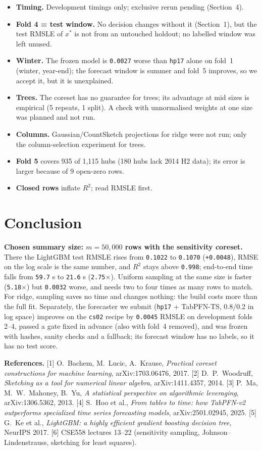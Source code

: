 \documentclass[10pt,a4paper,twocolumn]{article}
\newcommand{\n}[1]{\texttt{#1}}
\newcommand{\code}[1]{\texttt{#1}}
\begin{document}
\begin{itemize}
\item \textbf{Timing.} Development timings only; exclusive rerun pending (Section~4).
\item \textbf{Fold 4 = test window.} No decision changes without it (Section~1), but the test RMSLE of $x^\ast$ is not from an
  untouched holdout; no labelled window was left unused.
\item \textbf{Winter.} The frozen model is \n{0.0027} worse than \code{hp17} alone on fold~1 (winter, year-end); the forecast
  window is summer and fold~5 improves, so we accept it, but it is unexplained.
\item \textbf{Trees.} The coreset has no guarantee for trees; its advantage at mid sizes is empirical (5 repeats, 1 split). A
  check with unnormalised weights at one size was planned and not run.
\item \textbf{Columns.} Gaussian/CountSketch projections for ridge were not run; only the column-selection experiment for trees.
\item \textbf{Fold 5} covers 935 of 1{,}115 hubs (180 hubs lack 2014 H2 data); its error is larger because of 9 open-zero rows.
\item \textbf{Closed rows} inflate $R^2$; read RMSLE first.
\end{itemize}

\section{Conclusion}

\textbf{Chosen summary size: $m=50{,}000$ rows with the sensitivity coreset.} There the LightGBM test RMSLE rises from
\n{0.1022} to \n{0.1070} (\n{+0.0048}), RMSE on the log scale is the same number, and $R^2$ stays above \n{0.998}; end-to-end
time falls from \n{59.7} s to \n{21.6} s (\n{2.75$\times$}). Uniform sampling at the same size is faster (\n{5.18$\times$}) but
\n{0.0032} worse, and needs two to four times as many rows to match. For ridge, sampling saves no time and changes nothing:
the build costs more than the full fit. Separately, the forecaster we submit (\code{hp17} + TabPFN-TS, 0.8/0.2 in log space)
improves on the \code{cs02} recipe by \n{0.0045} RMSLE on development folds 2--4, passed a gate fixed in advance (also with
fold~4 removed), and was frozen with hashes, sanity checks and a fallback; its forecast window has no labels, so it has no
test score.

{\footnotesize\textbf{References.} [1] O.~Bachem, M.~Lucic, A.~Krause, \emph{Practical coreset constructions for machine learning},
arXiv:1703.06476, 2017. [2] D.~P.~Woodruff, \emph{Sketching as a tool for numerical linear algebra}, arXiv:1411.4357, 2014.
[3] P.~Ma, M.~W.~Mahoney, B.~Yu, \emph{A statistical perspective on algorithmic leveraging}, arXiv:1306.5362, 2013.
[4] S.~Hoo et al., \emph{From tables to time: how TabPFN-v2 outperforms specialized time series forecasting models},
arXiv:2501.02945, 2025. [5] G.~Ke et al., \emph{LightGBM: a highly efficient gradient boosting decision tree}, NeurIPS 2017.
[6] CSE558 lectures 13--22 (sensitivity sampling, Johnson--Lindenstrauss, sketching for least squares).\par}
\end{document}
